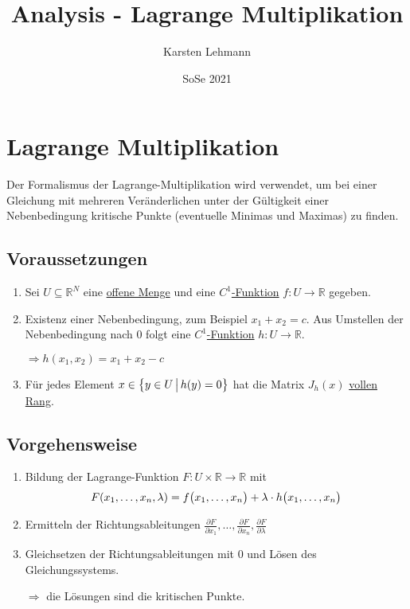 \documentclass{scrreprt}
\author{Karsten Lehmann}
\date{SoSe 2021}
\title{Analysis - Lagrange Multiplikation}
\begin{document}
\chapter{Lagrange Multiplikation}

Der Formalismus der Lagrange-Multiplikation wird verwendet,
um bei einer Gleichung mit mehreren Veränderlichen unter der
Gültigkeit einer Nebenbedingung kritische Punkte
(eventuelle Minimas und Maximas) zu finden.

\section{Voraussetzungen}

\begin{enumerate}[1)]
\item \label{vor:1}
  Sei $U \subseteq \mathbb{R}^N$ eine
  \hyperref[sec:offene_menge]{offene Menge} und eine
  \hyperref[sec:c-k-funktion]{$C^1$-Funktion}
  $f \colon U \to \mathbb{R}$ gegeben.

\item \label{vor:2}
  Existenz einer Nebenbedingung, zum Beispiel $x_1 + x_2 = c$.
  Aus Umstellen der Nebenbedingung nach $0$ folgt eine
  \hyperref[sec:c-k-funktion]{$C^1$-Funktion}
  $h \colon U \to \mathbb{R}$.

  $\Rightarrow h(x_1, x_2) = x_1 + x_2 - c$

\item \label{vor:3}
  Für jedes Element $x \in \qty\big{ y \in U \, {\big |} \, h(y) = 0}$
  hat die Matrix $\hyperref[sec:jacobi]{J_h(x)}$
  \hyperref[sec:rang]{vollen Rang}.
\end{enumerate}

\section{Vorgehensweise}

\begin{enumerate}[1)]
\item \label{step:1}
  Bildung der Lagrange-Funktion $F \colon U \times \mathbb{R} \to \mathbb{R}$ mit
  \[
    F(x_1, \ldots, x_n, \lambda) = f\qty\big(x_1, \ldots, x_n) + \lambda \cdot h\qty\big(x_1, \ldots, x_n)
  \]

\item \label{step:2}
  Ermitteln der Richtungsableitungen
  $\frac{\partial F}{\partial x_1}, \ldots, \frac{\partial F}{\partial x_n},
  \frac{\partial F}{\partial \lambda}$

\item \label{step:3}
  Gleichsetzen der Richtungsableitungen mit $0$ und
  Lösen des Gleichungssystems.

  $\Rightarrow$ die Lösungen sind die kritischen Punkte.
\end{enumerate}
\end{document}
